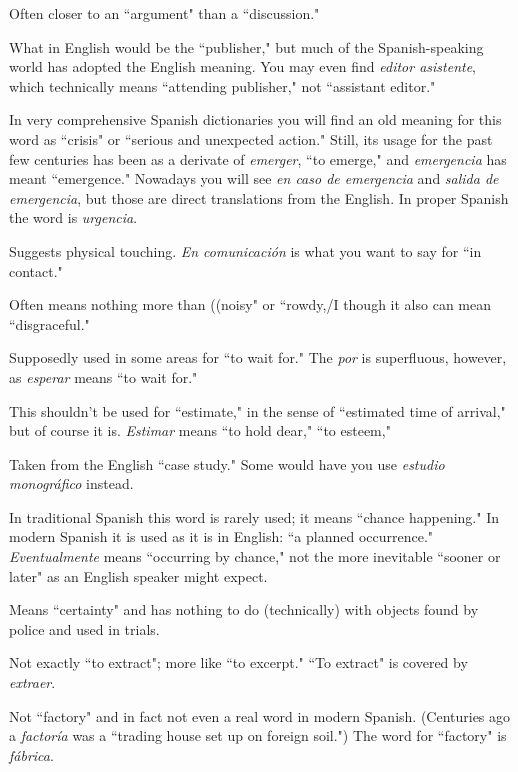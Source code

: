  Often closer to an ``argument" than a ``discussion."

 What in English would be the ``publisher," but much
of the Spanish-speaking world has adopted the English meaning. You
may even find \emph{editor asistente}, which technically means ``attending
publisher," not ``assistant editor."

 In very comprehensive Spanish dictionaries
you will find an old meaning for this word as ``crisis" or ``serious and
unexpected action." Still, its usage for the past few centuries has been
as a derivate of \emph{emerger}, ``to emerge," and \emph{emergencia} has meant
``emergence." Nowadays you will see \emph{en caso de emergencia} and \emph{salida de emergencia}, but those are direct translations from the English.
In proper Spanish the word is \emph{urgencia}.

 Suggests physical touching. \emph{En comunicación}
is what you want to say for ``in contact."

 Often means nothing more than ((noisy" or
``rowdy,/I though it also can mean ``disgraceful."

 Supposedly used in some areas for ``to wait
for." The \emph{por} is superfluous, however, as \emph{esperar} means ``to wait for."

 This shouldn't be used for ``estimate," in the sense
of ``estimated time of arrival," but of course it is. \emph{Estimar} means ``to
hold dear," ``to esteem,"

 Taken from the English ``case study."
Some would have you use \emph{estudio monográfico} instead.

 In traditional Spanish this word is rarely used; it
means ``chance happening." In modern Spanish it is used as it is in
English: ``a planned occurrence." \emph{Eventualmente} means ``occurring
by chance," not the more inevitable ``sooner or later" as an English
speaker might expect.

 Means ``certainty" and has nothing to do (technically) with objects found by police and used in trials.

 Not exactly ``to extract"; more like ``to excerpt."
``To extract" is covered by \emph{extraer}.

 Not ``factory" and in fact not even a real word in
modern Spanish. (Centuries ago a \emph{factoría} was a ``trading house set up
on foreign soil.") The word for ``factory" is \emph{fábrica}.

